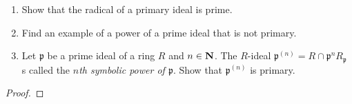 \newpage
\begin{problem}
\begin{enumerate}[noitemsep,label=(\alph*)]
\item Show that the radical of a primary ideal is prime.
\item Find an example of a power of a prime ideal that is not
  primary.
\item Let $\mathfrak{p}$ be a prime ideal of a ring $R$ and
  $n\in\mathbf{N}$. The $R$-ideal
  $\mathfrak{p}^{(n)}=R\cap\mathfrak{p}^nR_{\mathfrak{p}}$ s
  called the \emph{$n$th symbolic power of $\mathfrak{p}$}. Show
  that $\mathfrak{p}^{(n)}$ is primary.
\end{enumerate}
\end{problem}
\begin{proof}
\end{proof}

